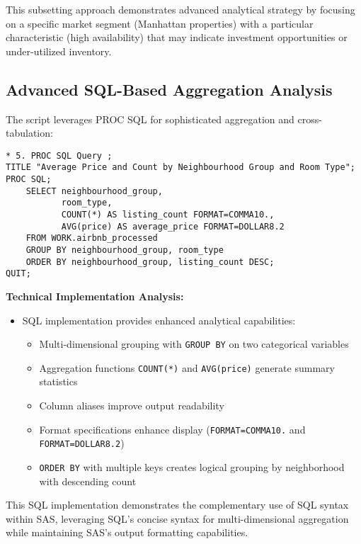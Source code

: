 \documentclass{article}
\begin{document}
This subsetting approach demonstrates advanced analytical strategy by focusing on a specific market segment (Manhattan properties) with a particular characteristic (high availability) that may indicate investment opportunities or under-utilized inventory.

\subsection{Advanced SQL-Based Aggregation Analysis}
The script leverages PROC SQL for sophisticated aggregation and cross-tabulation:

\begin{lstlisting}[style=SASStyle, caption=SQL-Based Aggregation and Cross-Tabulation]
* 5. PROC SQL Query ;
TITLE "Average Price and Count by Neighbourhood Group and Room Type";
PROC SQL;
    SELECT neighbourhood_group,
           room_type,
           COUNT(*) AS listing_count FORMAT=COMMA10.,
           AVG(price) AS average_price FORMAT=DOLLAR8.2
    FROM WORK.airbnb_processed
    GROUP BY neighbourhood_group, room_type
    ORDER BY neighbourhood_group, listing_count DESC;
QUIT;
\end{lstlisting}

\noindent
\textbf{Technical Implementation Analysis:}
\begin{itemize}[leftmargin=*]
    \item SQL implementation provides enhanced analytical capabilities:
    \begin{itemize}
        \item Multi-dimensional grouping with \texttt{GROUP BY} on two categorical variables
        \item Aggregation functions \texttt{COUNT(*)} and \texttt{AVG(price)} generate summary statistics
        \item Column aliases improve output readability
        \item Format specifications enhance display (\texttt{FORMAT=COMMA10.} and \texttt{FORMAT=DOLLAR8.2})
        \item \texttt{ORDER BY} with multiple keys creates logical grouping by neighborhood with descending count
    \end{itemize}
\end{itemize}

This SQL implementation demonstrates the complementary use of SQL syntax within SAS, leveraging SQL's concise syntax for multi-dimensional aggregation while maintaining SAS's output formatting capabilities.
\end{document}
